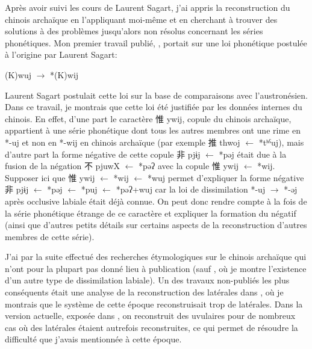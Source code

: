 \documentclass[oldfontcommands,oneside,a4paper,11pt]{memoir}
\newcommand{\zh}[1]{{\cn #1}}
\begin{document}
Après avoir suivi les cours de Laurent Sagart, j'ai appris la reconstruction du chinois archaïque en l'appliquant moi-même et en cherchant à trouver des solutions à des problèmes jusqu'alors non résolus concernant les séries phonétiques. Mon premier travail publié, \citet{jacques00ywij}, portait sur une loi phonétique postulée à l'origine par Laurent Sagart:
\begin{exe}
\ex 
\glt *(K)wuj $\rightarrow $ *(K)wij 
\end{exe}
Laurent Sagart postulait cette loi sur la base de comparaisons avec l'austronésien. Dans ce travail, je montrais que cette loi été justifiée par les données internes du chinois. En effet, d'une part le caractère \zh{惟} ywij, copule du chinois archaïque, appartient à une série phonétique dont tous les autres membres ont une rime en *-uj et non en *-wij en chinois archaïque (par exemple \zh{推} thwoj $\leftarrow$ *tʰˁuj), mais d'autre part la forme négative de cette copule \zh{非} pjɨj $\leftarrow$ *pəj était due à la fusion de la négation \zh{不} pjuwX  $\leftarrow$ *pəʔ avec la copule \zh{惟} ywij $\leftarrow$ *wij. Supposer ici que \zh{惟} ywij $\leftarrow$ *wij $\leftarrow$ *wuj permet d'expliquer la forme négative \zh{非} pjɨj $\leftarrow$ *pəj $\leftarrow$ *puj $\leftarrow$ *pəʔ+wuj car la loi de dissimilation *-uj $\rightarrow $ *-əj après occlusive labiale était déjà connue. On peut donc rendre compte à la fois de la série phonétique étrange de ce caractère et expliquer la formation du négatif (ainsi que d'autres petits détails sur certains aspects de la reconstruction  d'autres membres de cette série).

J'ai par la suite effectué des recherches étymologiques sur le chinois archaïque qui n'ont pour la plupart pas donné lieu à publication (sauf \citet{jacques03dissimilation}, où je montre l'existence d'un autre type de dissimilation labiale). Un des travaux non-publiés les plus conséquents était une analyse de  la reconstruction des latérales dans \citet{sagart99roc}, où je montrais que le système de cette époque reconstruisait trop de latérales. Dans la version actuelle, exposée dans \citet{sagart-baxter09}, on reconstruit des uvulaires pour de nombreux cas où des latérales étaient autrefois reconstruites, ce qui permet de résoudre la difficulté que j'avais mentionnée à cette époque.
\end{document}
